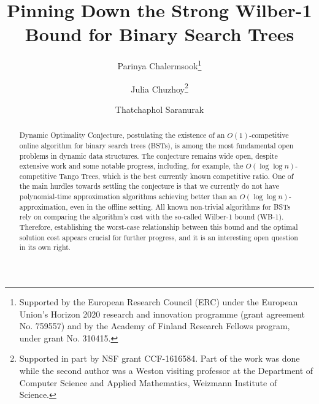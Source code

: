 \documentclass{toc}
\begin{document}
\begin{frontmatter} %
  
\title{Pinning Down the Strong Wilber-1 Bound for Binary Search
    Trees
 }  %

%
%

%
%
%

%
%
%
%
%
%
%
%
%
%
%
%


%
%
%
%

%

\author[chalermsook]{Parinya Chalermsook\thanks{Supported by
the  %
European Research Council (ERC) under the European Union’s Horizon 2020 research and innovation programme (grant agreement No. 759557) and by
the  %
Academy of Finland Research Fellows
program,   %
under grant No. 310415.}}
\author[chuzhoy]{Julia Chuzhoy\thanks{Supported in part by NSF grant CCF-1616584. Part of the work was done while the second author was a Weston visiting professor at the Department of Computer Science and Applied Mathematics, Weizmann Institute of Science.}}
\author[saranurak]{Thatchaphol Saranurak}

%
%
%
%

%
%
%
%
%
%
\begin{abstract}
Dynamic Optimality Conjecture, postulating the existence  of an $O(1)$-competitive online algorithm for binary search trees (BSTs),  is among the most fundamental open problems in dynamic data structures. The conjecture remains wide open, despite extensive work and some notable progress, including, for example, the $O(\log\log n)$-competitive Tango Trees, which is the best currently known competitive ratio.  
One of the main hurdles towards settling the conjecture is that we currently do not have polynomial-time approximation algorithms achieving better than an $O(\log \log n)$-approximation, even in the offline setting. All known non-trivial algorithms for BSTs rely on comparing the algorithm's cost with the so-called Wilber-1 bound (WB-1). Therefore, establishing the worst-case relationship between this bound and the optimal solution cost appears crucial for further progress, and it is an interesting open question in its own right.


\end{abstract}
\end{frontmatter}
\end{document}
